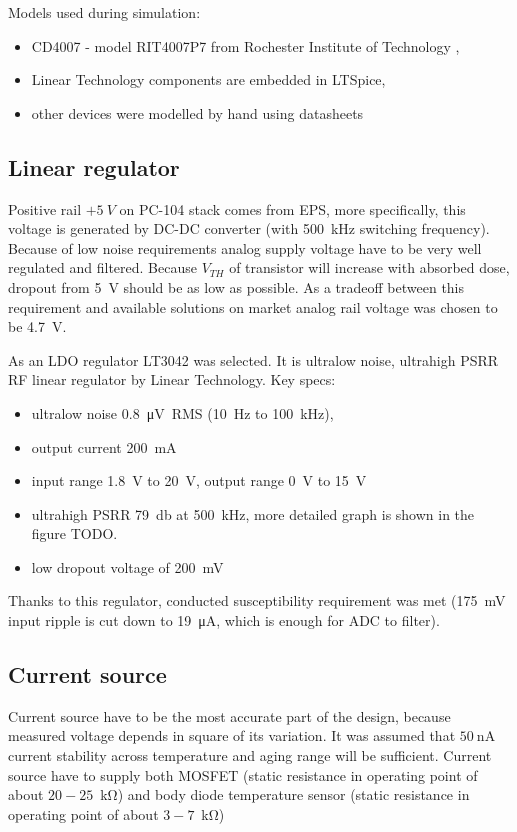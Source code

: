         Models used during simulation:
        \begin{itemize}
            \item CD4007 - model RIT4007P7 from Rochester Institute of Technology \cite{RIT_FULLER},
            \item Linear Technology components are embedded in LTSpice,
            \item other devices were modelled by hand using datasheets
        \end{itemize}

    \subsection{Linear regulator}
        Positive rail $+\SI{5}{V}$ on PC-104 stack comes from EPS, more specifically, this voltage is generated by DC-DC converter (with \SI{500}{\kilo\hertz} switching frequency). Because of low noise requirements analog supply voltage have to be very well regulated and filtered. Because $V_{TH}$ of transistor will increase with absorbed dose, dropout from \SI{5}{\volt} should be as low as possible. As a tradeoff between this requirement and available solutions on market analog rail voltage was chosen to be \SI{4.7}{\volt}.

        As an LDO regulator LT3042 was selected. It is ultralow noise, ultrahigh PSRR RF linear regulator by Linear Technology. Key specs:
        \begin{itemize}
            \item ultralow noise \SI{0.8}{\micro\volt RMS} (\SI{10}{\hertz} to \SI{100}{\kilo\hertz}),
            \item output current \SI{200}{\milli\ampere}
            \item input range \SI{1.8}{\volt} to \SI{20}{\volt}, output range \SI{0}{\volt} to \SI{15}{\volt}
            \item ultrahigh PSRR \SI{79}{\decibel} at \SI{500}{\kilo\hertz}, more detailed graph is shown in the figure TODO.
            \item low dropout voltage of \SI{200}{\mV}
        \end{itemize}

        Thanks to this regulator, conducted susceptibility requirement was met (\SI{175}{\mV} input ripple is cut down to \SI{19}{\uA}, which is enough for ADC to filter).

    \subsection{Current source}
        Current source have to be the most accurate part of the design, because measured voltage depends in square of its variation. It was assumed that $\SI{50}{\nano\ampere}$ current stability across temperature and aging range will be sufficient. Current source have to supply both MOSFET (static resistance in operating point of about $20-25$~\si{\kilo\ohm}) and body diode temperature sensor (static resistance in operating point of about $3-7$~\si{\kilo\ohm})

